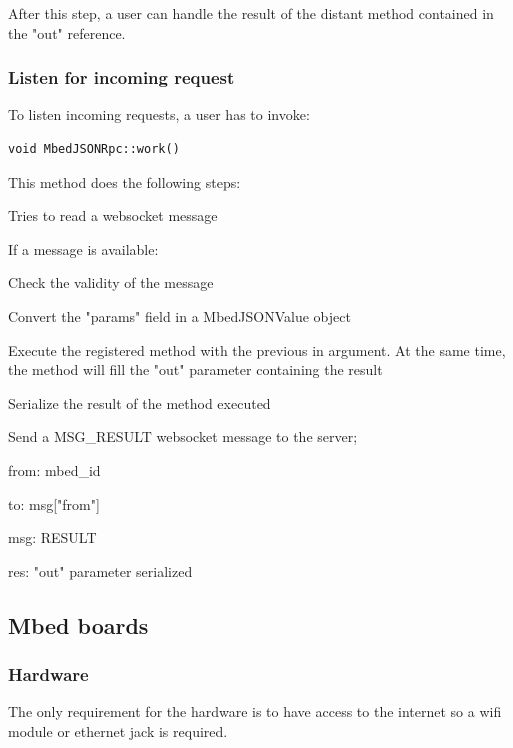 \documentclass[pdftex,10pt,a4paper]{report}
\newenvironment{packed_item}{
\begin{itemize}
  \setlength{\itemsep}{1pt}
  \setlength{\parskip}{0pt}
  \setlength{\parsep}{0pt}
}{\end{itemize}}
\begin{document}
After this step, a user can handle the result of the distant method contained in the "out" reference.

\subsubsection{Listen for incoming request}
To listen incoming requests, a user has to invoke:
\begin{lstlisting}[label=Listen incoming requests,caption=Listen incoming requests]
void MbedJSONRpc::work()
\end{lstlisting}

This method does the following steps:
\begin{packed_item}
	\item Tries to read a websocket message
	\item If a message is available:
		\begin{packed_item}
			\item Check the validity of the message
			\item Convert the "params" field in a MbedJSONValue object
			\item Execute the registered method with the previous in argument. At the same time, the method will fill the "out" parameter containing the result
			\item Serialize the result of the method executed
			\item Send a MSG\_RESULT websocket message to the server;
			\begin{packed_item}
				\item from: mbed\_id
				\item to: msg["from"]
				\item msg: RESULT
				\item res: "out" parameter serialized
			\end{packed_item}
		\end{packed_item}
\end{packed_item}


\subsection{Mbed boards}
\subsubsection{Hardware}
The only requirement for the hardware is to have access to the internet so a wifi module or ethernet jack is required.
\end{document}

